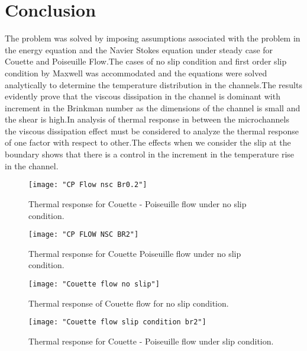 \documentclass[14pt,one side, a4paper]{extbook}
\begin{document}
	 	\section{Conclusion}
	 	The problem was solved by imposing assumptions associated with the problem in the energy equation and the Navier Stokes equation under steady case for Couette and Poiseuille Flow.The cases of no slip condition and first order slip condition by Maxwell was accommodated and the equations were solved analytically to determine the temperature distribution in the channels.The results evidently prove that the viscous dissipation in the channel is dominant with increment in the Brinkman number as the dimensions of the channel is small and the shear is high.In analysis of thermal response in between the microchannels the viscous dissipation effect must be considered to analyze the thermal response of one factor with respect to other.The effects when we consider the slip at the boundary shows that there is a control in the increment in the temperature rise in the channel.
	 	
	 	\begin{figure}[ht]
	 		\centering
	 		\texttt{[image: "CP Flow nsc Br0.2"]}
	 		\caption{Thermal response for Couette - Poiseuille flow under no slip condition.}
	 		\label{fig:cp-flow-nsc-br0}
	 	\end{figure}
	 	\begin{figure}[ht]
	 		\centering
	 		\texttt{[image: "CP FLOW NSC BR2"]}
	 		\caption{Thermal response for Couette Poiseuille flow under no slip condition.}
	 		\label{fig:cp-flow-nsc-br2}
	 	\end{figure}
	 	
	 	\begin{figure}[ht]
	 		\centering
	 		\texttt{[image: "Couette flow no slip"]}
	 		\caption{Thermal response of Couette flow for no slip condition.}
	 		\label{fig:couette-flow-no-slip}
	 	\end{figure}
	 	
	 	\begin{figure}[ht]
	 		\centering
	 		\texttt{[image: "Couette flow slip condition br2"]}
	 		\caption[Thermal response for Couette - Poiseuille flow under slip condition.]{Thermal response for Couette - Poiseuille flow under slip condition.}
	 		\label{fig:couette-flow-slip-condition-br2}
	 	\end{figure}
	
\end{document}
